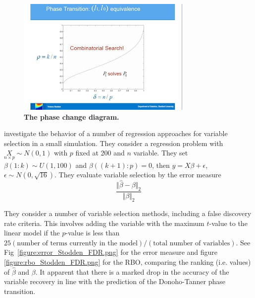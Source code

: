 \documentclass[10pt,letterpaper]{article}
\begin{document}
\begin{figure}[tbhp] 
 \begin{adjustwidth}{-1.00in}{0in}
    \centering
    \includegraphics[totalheight=6cm]{./figs/phase-diagram-equivalence.png} 
    \caption{{\bf The phase change diagram.}}
    \label{figure:phase-diagram-equivalence.png} 
    \vspace{4ex}
  \end{adjustwidth}
\end{figure}


\cite{Donoho.and.Stodden.2006} investigate the behavior of a number of
regression approaches for variable selection in a small simulation.  They consider a regression problem with 
$\underset{n\times p}{X}\sim N(0,1)$ with $p$ fixed at 200 and $n$ variable.
They  set $\beta(1:k) \sim U(1,100)$ and $\beta((k+1):p) =0$, then  $y= X\beta + \epsilon$, $\epsilon \sim
N(0,\sqrt{16})$. They evaluate variable selection by the error measure 
$$\frac{\Vert\hat{\beta}-\beta\Vert_2}{\Vert\beta\Vert_2}$$

They consider a number of variable selection methods, including a false discovery rate criteria. This involves adding
the variable with the maximum $t$-value to the linear model if the $p$-value is less than 
$25(\text{number of  terms  currently  in  the  model})/(\text{total  number  of  variables})$.  
See Fig~\ref{figure:error_Stodden_FDR.png} for the error measure and
figure \ref{figure:rbo_Stodden_FDR.png} for the RBO, comparing the ranking (i.e. values) of $\hat{\beta}$ and $\beta$.
It apparent that there is a marked drop in the accuracy of the variable recovery in line with the prediction of the
Donoho-Tanner phase transition.
\end{document}
